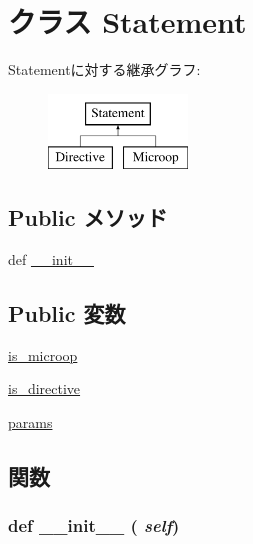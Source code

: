 \hypertarget{classmicro__asm_1_1Statement}{
\section{クラス Statement}
\label{classmicro__asm_1_1Statement}
}
Statementに対する継承グラフ:\begin{figure}[H]
\begin{center}
\leavevmode
\includegraphics[height=2cm]{classmicro__asm_1_1Statement}
\end{center}
\end{figure}
\subsection*{Public メソッド}
\begin{DoxyCompactItemize}
\item 
def \hyperlink{classmicro__asm_1_1Statement_ac775ee34451fdfa742b318538164070e}{\_\-\_\-init\_\-\_\-}
\end{DoxyCompactItemize}
\subsection*{Public 変数}
\begin{DoxyCompactItemize}
\item 
\hyperlink{classmicro__asm_1_1Statement_ad8d639c296a2174eaecfe07681b44d8d}{is\_\-microop}
\item 
\hyperlink{classmicro__asm_1_1Statement_a7715b944fddfe15aad875fe3c226d81b}{is\_\-directive}
\item 
\hyperlink{classmicro__asm_1_1Statement_a41000f175dc0115080e2a682cc06dbe9}{params}
\end{DoxyCompactItemize}


\subsection{関数}
\hypertarget{classmicro__asm_1_1Statement_ac775ee34451fdfa742b318538164070e}{
\subsubsection[{\_\-\_\-init\_\-\_\-}]{\setlength{\rightskip}{0pt plus 5cm}def \_\-\_\-init\_\-\_\- ( {\em self})}}
\label{classmicro__asm_1_1Statement_ac775ee34451fdfa742b318538164070e}


